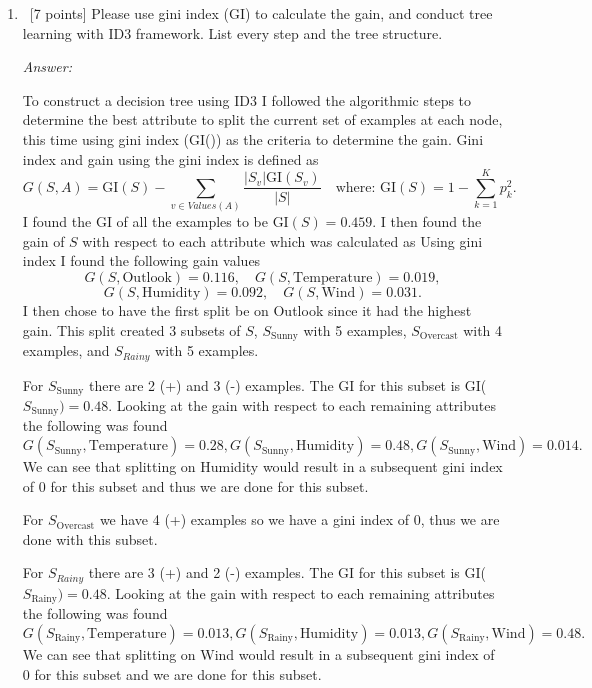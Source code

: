\documentclass[12pt, fullpage,letterpaper]{article}
\begin{document}
\begin{enumerate}
\begin{enumerate}
	\item~[7 points] Please use gini index (GI) to calculate the gain, and conduct tree learning with ID3 framework. List every step and the tree structure.

    \textit{Answer:} 

    To construct a decision tree using ID3 I followed the algorithmic steps to determine the best attribute to split the current set of examples at each node, this time using gini index (GI()) as the criteria to determine the gain. Gini index and gain using the gini index is defined as 
    \[
        G(S,A) = \text{GI}(S) - \sum_{v \in Values(A)}{\frac{|S_v|\text{GI}(S_v)}{|S|}} \quad 
        \text{where: } \text{GI}(S) = 1 - \sum_{k=1}^K {p_k^2}.
    \] 
    I found the GI of all the examples to be GI$(S) = 0.459$. I then found the gain of $S$ with respect to each attribute which was calculated as 
    Using gini index I found the following gain values
    \[
        G(S,\text{Outlook}) = 0.116,\quad
        G(S,\text{Temperature}) = 0.019, 
    \]
    \[
        G(S,\text{Humidity}) = 0.092,\quad
        G(S,\text{Wind}) = 0.031.
    \]
    I then chose to have the first split be on Outlook since it had the highest gain. This split created 3 subsets of $S$, $S_{\text{Sunny}}$ with 5 examples, $S_{\text{Overcast}}$ with 4 examples, and $S_{Rainy}$ with 5 examples.

    For $S_{\text{Sunny}}$ there are 2 (+) and 3 (-) examples. 
    The GI for this subset is GI($S_{\text{Sunny}}) = 0.48$. Looking at the gain with respect to each remaining attributes the following was found
    \[
        G(S_{\text{Sunny}},\text{Temperature}) = 0.28,
        G(S_{\text{Sunny}},\text{Humidity}) = 0.48,
        G(S_{\text{Sunny}},\text{Wind}) = 0.014. 
    \]
    We can see that splitting on Humidity would result in a subsequent gini index of 0 for this subset and thus we are done for this subset.
    
    For $S_{\text{Overcast}}$ we have 4 (+) examples so we have a gini index of 0, thus we are done with this subset.

    For $S_{Rainy}$ there are 3 (+) and 2 (-) examples. 
    The GI for this subset is GI($S_{\text{Rainy}}) = 0.48$. Looking at the gain with respect to each remaining attributes the following was found
    \[
        G(S_{\text{Rainy}},\text{Temperature}) = 0.013,
        G(S_{\text{Rainy}},\text{Humidity}) = 0.013,
        G(S_{\text{Rainy}},\text{Wind}) = 0.48. 
    \]
    We can see that splitting on Wind would result in a subsequent gini index of 0 for this subset and we are done for this subset.


\end{enumerate}
\end{enumerate}
\end{document}

